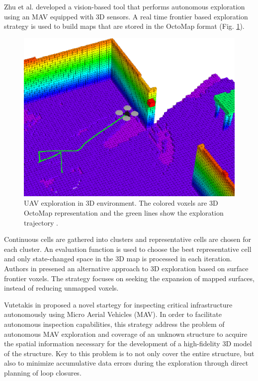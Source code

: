Zhu
et al. \cite{Zhu2015} developed a vision-based tool that performs autonomous exploration using an MAV equipped with 3D sensors. A real time frontier based exploration strategy is
used to build maps that are stored in the OctoMap format (Fig. \ref{fig:octomap}).

\begin{figure}[t!]
	\centering
	\includegraphics[width=1.0\columnwidth]{./pictures/octomap_and_drone.png}	
	\caption{UAV exploration in 3D environment. The colored voxels are 3D OctoMap representation and the green lines show the exploration trajectory \cite{Wang2019}.}
	\label{fig:octomap}
\end{figure}

Continuous cells are gathered into clusters and representative cells are chosen for each cluster. An
evaluation function is used to choose the best representative
cell and only state-changed space in the 3D map is processed
in each iteration.
Authors in \cite{Senarathne2016} presened an alternative approach to 3D
exploration based on surface frontier voxels. The strategy focuses on seeking the expansion of mapped surfaces, instead of reducing unmapped voxels. 

Vutetakis in \cite{Vutetakis2019} proposed a novel startegy for inspecting
critical infrastructure autonomously using Micro Aerial Vehicles (MAV). In order to facilitate
autonomous inspection capabilities, this strategy address the problem of autonomous MAV exploration and coverage of an unknown
structure to acquire the spatial information necessary for the
development of a high-fidelity 3D model of the structure. Key to
this problem is to not only cover the entire structure, but also to minimize
accumulative data errors during the exploration through direct
planning of loop closures. 

